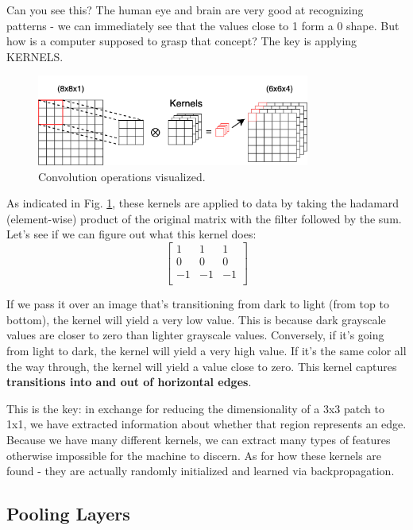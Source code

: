 \documentclass[12pt]{article}
\begin{document}
Can you see this? The human eye and brain are very good at recognizing patterns - we can immediately see that the values close to 1 form a 0 shape. But how is a computer supposed to grasp that concept? The key is applying KERNELS. 

\begin{figure}[H]
    \centering
    \includegraphics[width=0.8\textwidth]{../media/convolutions.png}
    \caption{Convolution operations visualized. }
    \label{fig:convolutions}
\end{figure}


As indicated in Fig. \ref{fig:convolutions}, these kernels are applied to data by taking the hadamard (element-wise) product of the original matrix with the filter followed by the sum. Let's see if we can figure out what this kernel does:
\[
\begin{bmatrix}
1 & 1 & 1 \\
0 & 0 & 0 \\
-1 & -1 & -1 \\
\end{bmatrix}
\]

If we pass it over an image that's transitioning from dark to light (from top to bottom), the kernel will yield a very low value. This is because dark grayscale values are closer to zero than lighter grayscale values. Conversely, if it's going from light to dark, the kernel will yield a very high value. If it's the same color all the way through, the kernel will yield a value close to zero. This kernel captures \textbf{transitions into and out of horizontal edges}. 

This is the key: in exchange for reducing the dimensionality of a 3x3 patch to 1x1, we have extracted information about whether that region represents an edge. Because we have many different kernels, we can extract many types of features otherwise impossible for the machine to discern. As for how these kernels are found - they are actually randomly initialized and learned via backpropagation. 

\subsection{Pooling Layers}
\end{document}
